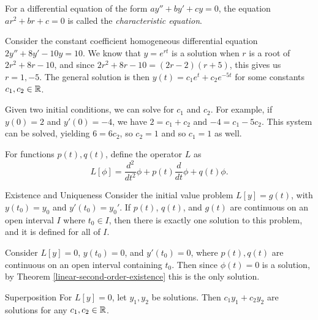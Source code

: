 \begin{defn}
    For a differential equation of the form $ay'' + by' + cy = 0$, the equation $ar^2 + br + c = 0$ is called the \emph{characteristic equation}.
\end{defn}

\begin{exmp}
    Consider the constant coefficient homogeneous differential equation $2y'' + 8y' - 10y = 10$. We know that $y = e^{rt}$ is a solution when $r$ is a root of $2r^2 + 8r - 10$, and since $2r^2 + 8r - 10 = (2r-2)(r+5)$, this gives us $r = 1, -5$. The general solution is then $y(t) = c_1e^t + c_2e^{-5t}$ for some constants $c_1, c_2 \in \mathbb{R}$.

    Given two initial conditions, we can solve for $c_1$ and $c_2$. For example, if $y(0) = 2$ and $y'(0) = -4$, we have $2 = c_1 + c_2$ and $-4 = c_1 - 5c_2$. This system can be solved, yielding $6 = 6c_2$, so $c_2 = 1$ and so $c_1 = 1$ as well.
\end{exmp}

\begin{defn}
    For functions $p(t), q(t)$, define the operator $L$ as
    \[L[\phi] = \frac{d^2}{dt^2}\phi + p(t)\frac{d}{dt}\phi + q(t)\phi.\]
\end{defn}

\begin{thm}\label{linear-second-order-existence}Existence and Uniqueness\proofbreak
    Consider the initial value problem $L[y] = g(t)$, with $y(t_0) = y_0$ and $y'(t_0) = y_0'$. If $p(t)$, $q(t)$, and $g(t)$ are continuous on an open interval $I$ where $t_0 \in I$, then there is exactly one solution to this problem, and it is defined for all of $I$.
\end{thm}

\begin{exmp}
    Consider $L[y] = 0$, $y(t_0) = 0$, and $y'(t_0) = 0$, where $p(t), q(t)$ are continuous on an open interval containing $t_0$. Then since $\phi(t) = 0$ is a solution, by Theorem \ref{linear-second-order-existence} this is the only solution.
\end{exmp}

\begin{thm}\label{linear-superposition}Superposition\proofbreak
    For $L[y] = 0$, let $y_1, y_2$ be solutions. Then $c_1y_1 + c_2y_2$ are solutions for any $c_1, c_2 \in \mathbb{R}$.
\end{thm}

